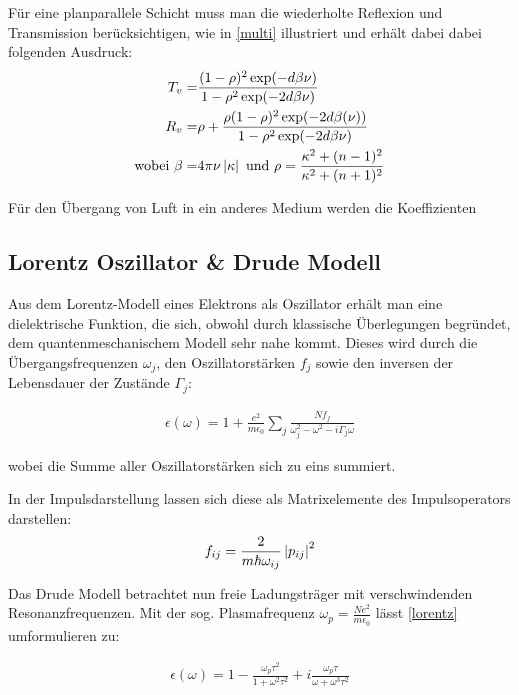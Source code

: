 \documentclass[paper=a4,fontsize=10pt,DIV=18,twocolumn,parskip=half]{scrartcl}
\numberwithin{equation}{section}    %
\begin{document}
Für eine planparallele Schicht muss man die wiederholte Reflexion und 
Transmission berücksichtigen, wie in \cref{multi} illustriert und erhält dabei 
dabei folgenden Ausdruck:
\begin{align}
    T_v= & \frac{(1-\rho)^2 \exp(-d\beta \nu )}{1-\rho^2 \exp (-2d\beta\nu)} \\ 
    \vspace{2em}
    R_v= & \rho+\frac{\rho (1-\rho)^2 \exp (-2 d \beta (\nu ))}{1-\rho^2 \exp(-2 
    d \beta \nu )}\\
    \vspace{2em}
    \text{wobei } \beta= & 4 \pi  \nu  \left| \kappa \right|
    \text{ und }\rho= \frac{\kappa ^2+(n-1)^2}{\kappa ^2+(n+1)^2}
    \label{trans}
\end{align}


Für den Übergang von Luft in ein anderes Medium werden die Koeffizienten 

\subsection{Lorentz Oszillator \& Drude Modell}

Aus dem Lorentz-Modell eines Elektrons als Oszillator erhält man eine 
dielektrische Funktion, die sich, obwohl durch klassische Überlegungen 
begründet, dem quantenmeschanischem Modell sehr nahe kommt. Dieses wird durch 
die Übergangsfrequenzen $\omega_j$, den Oszillatorstärken $f_j$ sowie den 
inversen der Lebensdauer der Zustände $\Gamma_j$:

\begin{align}
    \epsilon(\omega) = 1 + \frac{e^2}{m\epsilon_0}\sum_j\frac{Nf_j}{\omega_j^2 
    - \omega^2 - i\Gamma_j\omega}
    \label{lorentz}
\end{align}

wobei die Summe aller Oszillatorstärken sich zu eins summiert.

In der Impulsdarstellung lassen sich diese als Matrixelemente des 
Impulsoperators darstellen:
\begin{align}
    f_{ij}=\frac{2}{m\hbar\omega_{ij}}\left\lvert p_{ij} \right\rvert ^2
\end{align}


Das Drude Modell betrachtet nun freie Ladungsträger mit verschwindenden 
Resonanzfrequenzen. Mit der sog. Plasmafrequenz 
$\omega_p=\frac{Ne^2}{m\epsilon_0}$ lässt \cref{lorentz} umformulieren zu:

\begin{align}
    \epsilon(\omega)=1-\frac{\omega_p\tau^2}{1+\omega^2\tau^2}+
    i\frac{\omega_p\tau}{\omega+\omega^3\tau^2}
    \label{drude}
\end{align}
\end{document}
